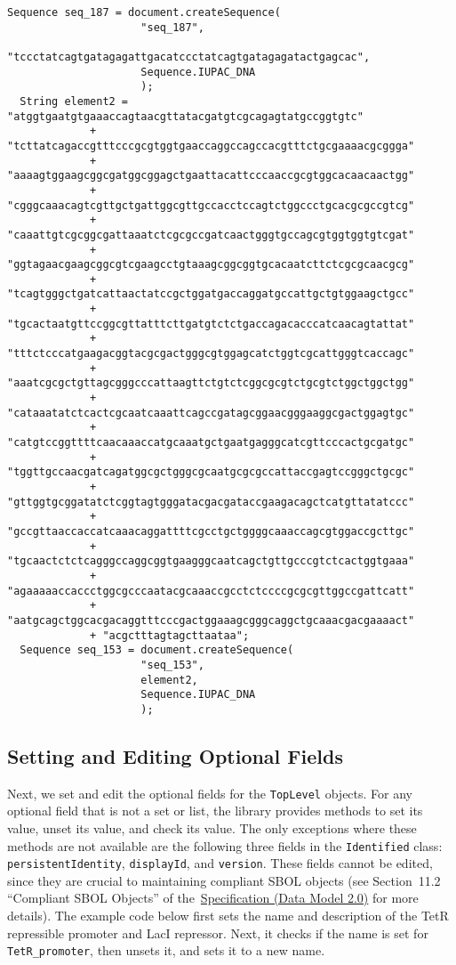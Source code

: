 \begin{minipage}{0.95\textwidth} 
\begin{lstlisting}[basicstyle=\footnotesize\ttfamily]
  Sequence seq_187 = document.createSequence(
                     "seq_187",
                     "tccctatcagtgatagagattgacatccctatcagtgatagagatactgagcac",
                     Sequence.IUPAC_DNA
                     );
  String element2 = "atggtgaatgtgaaaccagtaacgttatacgatgtcgcagagtatgccggtgtc"
             + "tcttatcagaccgtttcccgcgtggtgaaccaggccagccacgtttctgcgaaaacgcggga"
             + "aaaagtggaagcggcgatggcggagctgaattacattcccaaccgcgtggcacaacaactgg"
             + "cgggcaaacagtcgttgctgattggcgttgccacctccagtctggccctgcacgcgccgtcg"
             + "caaattgtcgcggcgattaaatctcgcgccgatcaactgggtgccagcgtggtggtgtcgat"
             + "ggtagaacgaagcggcgtcgaagcctgtaaagcggcggtgcacaatcttctcgcgcaacgcg"
             + "tcagtgggctgatcattaactatccgctggatgaccaggatgccattgctgtggaagctgcc"
             + "tgcactaatgttccggcgttatttcttgatgtctctgaccagacacccatcaacagtattat"
             + "tttctcccatgaagacggtacgcgactgggcgtggagcatctggtcgcattgggtcaccagc"
             + "aaatcgcgctgttagcgggcccattaagttctgtctcggcgcgtctgcgtctggctggctgg"
             + "cataaatatctcactcgcaatcaaattcagccgatagcggaacgggaaggcgactggagtgc"
             + "catgtccggttttcaacaaaccatgcaaatgctgaatgagggcatcgttcccactgcgatgc"
             + "tggttgccaacgatcagatggcgctgggcgcaatgcgcgccattaccgagtccgggctgcgc"
             + "gttggtgcggatatctcggtagtgggatacgacgataccgaagacagctcatgttatatccc"
             + "gccgttaaccaccatcaaacaggattttcgcctgctggggcaaaccagcgtggaccgcttgc"
             + "tgcaactctctcagggccaggcggtgaagggcaatcagctgttgcccgtctcactggtgaaa"
             + "agaaaaaccaccctggcgcccaatacgcaaaccgcctctccccgcgcgttggccgattcatt"
             + "aatgcagctggcacgacaggtttcccgactggaaagcgggcaggctgcaaacgacgaaaact"
             + "acgctttagtagcttaataa";
  Sequence seq_153 = document.createSequence(
                     "seq_153",
                     element2,
                     Sequence.IUPAC_DNA
                     );
\end{lstlisting}
\end{minipage}

\subsection*{Setting and Editing Optional Fields}
Next, we set and edit the optional fields for the \lstinline+TopLevel+ objects. For any optional field that is not a set or list, the library provides methods to set its value, unset its value, and check its value. The only exceptions where these methods are not available are the following three fields in the \lstinline+Identified+ class: \lstinline+persistentIdentity+, \lstinline+displayId+, and
\lstinline+version+.  These fields cannot be edited, since they are crucial to maintaining
compliant SBOL objects (see Section~11.2 ``Compliant SBOL Objects'' of the~\href{http://sbolstandard.org/downloads/specification-data-model-2-0/}{Specification
  (Data Model 2.0)} for more details).  The example code below first sets the name and description of the
TetR repressible promoter and LacI repressor.  Next, it checks if the name is set for \lstinline+TetR_promoter+, then unsets it, and sets it to a new name.
 
